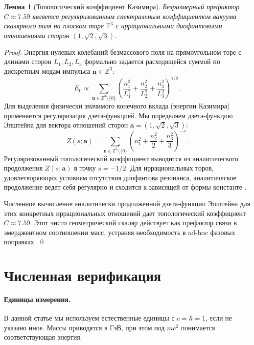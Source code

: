 \documentclass[11pt,a4paper]{article}
\newtheorem{lemma}[theorem]{Лемма}
\begin{document}
\begin{lemma}[Топологический коэффициент Казимира]
\label{lem:constant}
Безразмерный префактор $C \approx 7.59$ является регуляризованным спектральным коэффициентом вакуума скалярного поля на плоском торе $\mathbb{T}^3$ с иррациональными диофантовыми отношениями сторон $(1, \sqrt{2}, \sqrt{3})$.
\end{lemma}

\begin{proof}
Энергия нулевых колебаний безмассового поля на прямоугольном торе с длинами сторон $L_1, L_2, L_3$ формально задается расходящейся суммой по дискретным модам импульса $\mathbf{n} \in \mathbb{Z}^3$:
\[
E_0 \propto \sum_{\mathbf{n} \in \mathbb{Z}^3 \setminus \{0\}} 
\left( \frac{n_1^2}{L_1^2} + \frac{n_2^2}{L_2^2} + \frac{n_3^2}{L_3^2} \right)^{1/2}.
\]
Для выделения физически значимого конечного вклада (энергии Казимира) применяется регуляризация дзета-функцией. Мы определяем дзета-функцию Эпштейна для вектора отношений сторон $\mathbf{a} = (1, \sqrt{2}, \sqrt{3})$:
\[
Z(s; \mathbf{a}) = \sum_{\mathbf{n} \in \mathbb{Z}^3 \setminus \{0\}} 
\left( n_1^2 + \frac{n_2^2}{2} + \frac{n_3^2}{3} \right)^{-s}.
\]
Регуляризованный топологический коэффициент выводится из аналитического продолжения $Z(s; \mathbf{a})$ в точку $s = -1/2$. Для иррациональных торов, удовлетворяющих условиям отсутствия диофантова резонанса, аналитическое продолжение ведет себя регулярно и сходится к зависящей от формы константе \citep{Lutken1986,Kirsten2001}. 

Численное вычисление аналитически продолженной дзета-функции Эпштейна для этих конкретных иррациональных отношений дает топологический коэффициент $C \approx 7.59$. Этот чисто геометрический скаляр действует как префактор связи в эмерджентном соотношении масс, устраняя необходимость в ad-hoc фазовых поправках. \qed
\end{proof}

\section{Численная верификация}
\label{sec:numeric}

\paragraph{Единицы измерения.} В данной статье мы используем естественные единицы с $c=\hbar=1$, если не указано иное. Массы приводятся в $\mathrm{ГэВ}$, при этом под $m c^2$ понимается соответствующая энергия.
\end{document}
